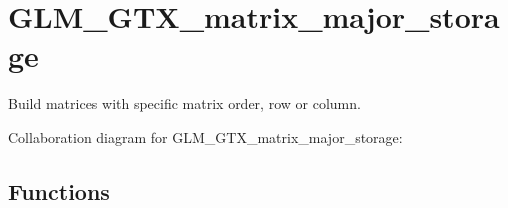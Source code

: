 \hypertarget{group__gtx__matrix__major__storage}{}\section{G\+L\+M\+\_\+\+G\+T\+X\+\_\+matrix\+\_\+major\+\_\+storage}
\label{group__gtx__matrix__major__storage}


Build matrices with specific matrix order, row or column.  


Collaboration diagram for G\+L\+M\+\_\+\+G\+T\+X\+\_\+matrix\+\_\+major\+\_\+storage\+:
\subsection*{Functions}

